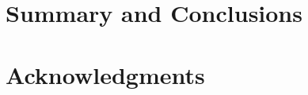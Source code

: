 \documentclass[fleqn,10pt]{SelfArx} %
\begin{document}

\bigskip
\bigskip
\section{Summary and Conclusions}
\bigskip
\bigskip
\bigskip



\section*{Acknowledgments} %







\end{document}

